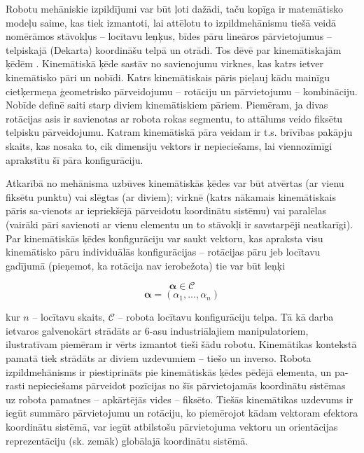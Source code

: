 \documentclass[12pt, a4paper]{article}
\numberwithin{equation}{section} %
\begin{document}
Robotu mehāniskie izpildījumi var būt ļoti dažādi, taču kopīga ir matemātisko modeļu saime, kas tiek izmantoti, lai attēlotu to izpildmehānismu tiešā veidā nomērāmos stāvokļus -- locītavu leņķus, bīdes pāru lineāros pārvietojumus -- telpiskajā (Dekarta) koordināšu telpā un otrādi. Tos dēvē par kinemātiskajām ķēdēm \cite{kinematics_illinois}. Kinemātiskā ķēde sastāv no savienojumu virknes, kas katrs ietver kinemātisko pāri un nobīdi. Katrs kinemātiskais pāris pieļauj kādu mainīgu cietķermeņa ģeometrisko pārveidojumu -- rotāciju un pārvietojumu -- kombināciju. Nobīde definē saiti starp diviem kinemātiskiem pāriem. Piemēram, ja divas rotācijas asis ir savienotas ar robota rokas segmentu, to attālums veido fiksētu telpisku pārveidojumu. Katram kinemātiskā pāra veidam ir t.s. brīvības pakāpju skaits, kas nosaka to, cik dimensiju vektors ir nepieciešams, lai viennozīmīgi aprakstītu šī pāra konfigurāciju.

Atkarībā no mehānisma uzbūves kinemātiskās ķēdes var būt atvērtas (ar vienu fiksētu punktu) vai slēgtas (ar diviem); virknē (katrs nākamais kinemātiskais pāris sa-vienots ar iepriekšējā pārveidotu koordinātu sistēmu) vai paralēlas (vairāki pāri savienoti ar vienu elementu un to stāvokļi ir savstarpēji neatkarīgi). Par kinemātiskās ķēdes konfigurāciju var saukt vektoru, kas apraksta visu kinemātisko pāru individuālās konfigurācijas -- rotācijas pāru jeb locītavu gadījumā (pieņemot, ka rotācija nav ierobežota) tie var būt leņķi


\begin{equation}
    \boldsymbol{\alpha} \in \mathcal{C}
\end{equation}
\begin{equation}
    \boldsymbol{\alpha} = (\alpha_1, ..., \alpha_n)
\end{equation}

kur $n$ -- locītavu skaits, $\mathcal{C}$ -- robota locītavu konfigurāciju telpa. Tā kā darba ietvaros galvenokārt strādāts ar 6-asu industriālajiem manipulatoriem, ilustratīvam piemēram ir vērts izmantot tieši šādu robotu. Kinemātikas kontekstā pamatā tiek strādāts ar diviem uzdevumiem -- tiešo un inverso. Robota izpildmehānisms ir piestiprināts pie kinemātiskās ķēdes pēdējā elementa, un pa-rasti nepieciešams pārveidot pozīcijas no šīs pārvietojamās koordinātu sistēmas uz robota pamatnes -- apkārtējās vides -- fiksēto. Tiešās kinemātikas uzdevums ir iegūt summāro pārvietojumu un rotāciju, ko piemērojot kādam vektoram efektora koordinātu sistēmā, var iegūt atbilstošu pārvietojuma vektoru un orientācijas reprezentāciju (sk. zemāk) globālajā koordinātu sistēmā. 
\end{document}
